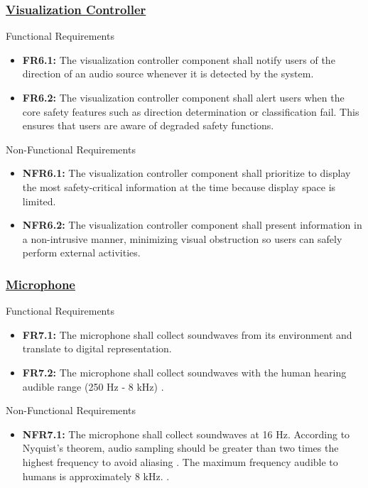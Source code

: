 \documentclass[12pt]{article}
\theoremstyle{definition}
\begin{document}
\subsubsection{\hyperref[comp:viz_controller]{Visualization Controller}}
Functional Requirements\label{sec:FR6}
\begin{itemize}
  \item \label{FR6_1}\textbf{FR6.1:} The visualization controller component
  shall notify users of the direction of an audio source whenever it is detected
  by the system.

  \item \label{FR6_2}\textbf{FR6.2:} The visualization controller component
  shall alert users when the core safety features such as direction
  determination or classification fail. This ensures that users are aware of
  degraded safety functions.
\end{itemize}

Non-Functional Requirements
\begin{itemize}
  \item \label{NFR6_1}\textbf{NFR6.1:} The visualization controller component
  shall prioritize to display the most safety-critical information at the time
  because display space is limited.
  \item \label{NFR6_2}\textbf{NFR6.2:} The visualization controller component
  shall present information in a non-intrusive manner, minimizing visual
  obstruction so users can safely perform external activities.
\end{itemize}

\subsubsection{\hyperref[comp:microphone]{Microphone}} Functional Requirements
\begin{itemize}
  \item \label{FR7_1}\textbf{FR7.1:} The microphone shall collect soundwaves
  from its environment and translate to digital representation.

  \item \label{FR7_2}\textbf{FR7.2:} The microphone shall collect soundwaves
  with the human hearing audible range (250 Hz - 8 kHz) \cite{MiracleEar2025}.
\end{itemize}

Non-Functional Requirements
\begin{itemize}
  \item \label{NFR7_1}\textbf{NFR7.1:} The microphone shall collect soundwaves
  at 16 Hz. According to Nyquist's theorem, audio sampling should be greater
  than two times the highest frequency to avoid aliasing \cite{DataForth2025}.
  The maximum frequency audible to humans is approximately 8 kHz.
  \cite{MiracleEar2025}.
\end{itemize}
\end{document}
